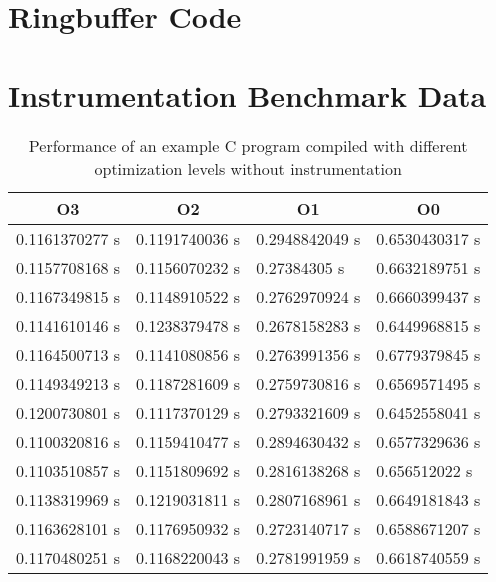 \clearpage

\section{Ringbuffer Code}
\label{sec:appendix:ringbuffer}



\clearpage

\section{Instrumentation Benchmark Data}
\label{sec:appendix:instrumentation_benchmark_data}

\begin{table}[]
  \caption{Performance of an example C program compiled with different optimization levels without instrumentation}
  \label{table:non_instrumented_optimizations_benchmark}
  \centering
  \begin{tabular}{llll}
    \multicolumn{1}{c}{O3} & \multicolumn{1}{c}{O2} & \multicolumn{1}{c}{O1} & \multicolumn{1}{c}{O0} \\ \hline
    0.1161370277 s & 0.1191740036 s & 0.2948842049 s & 0.6530430317 s \\
    0.1157708168 s & 0.1156070232 s & 0.27384305 s   & 0.6632189751 s \\
    0.1167349815 s & 0.1148910522 s & 0.2762970924 s & 0.6660399437 s \\
    0.1141610146 s & 0.1238379478 s & 0.2678158283 s & 0.6449968815 s \\
    0.1164500713 s & 0.1141080856 s & 0.2763991356 s & 0.6779379845 s \\
    0.1149349213 s & 0.1187281609 s & 0.2759730816 s & 0.6569571495 s \\
    0.1200730801 s & 0.1117370129 s & 0.2793321609 s & 0.6452558041 s \\
    0.1100320816 s & 0.1159410477 s & 0.2894630432 s & 0.6577329636 s \\
    0.1103510857 s & 0.1151809692 s & 0.2816138268 s & 0.656512022 s  \\
    0.1138319969 s & 0.1219031811 s & 0.2807168961 s & 0.6649181843 s \\
    0.1163628101 s & 0.1176950932 s & 0.2723140717 s & 0.6588671207 s \\
    0.1170480251 s & 0.1168220043 s & 0.2781991959 s & 0.6618740559 s \\

\end{tabular}
\end{table}
